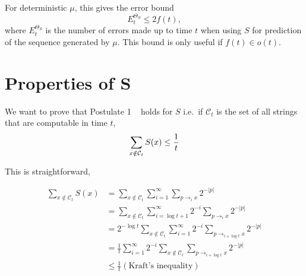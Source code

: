 \documentclass[a4paper]{article}
\def\X{\mathcal{X}}
\def\C{\mathcal{C}}
\begin{document}
For deterministic $\mu$,
this gives the error bound~\cite[Thm.\ 3.36]{Hutter:2005}
\[
E_t^{\Theta_S} \leq 2f(t),
\]
where $E_t^{\Theta_S}$ is the number of errors made up to time $t$
when using $S$ for prediction of the sequence generated by $\mu$.
This bound is only useful if $f(t) \in o(t)$.




\section{Properties of S}

We want to prove that Postulate 1 ~\cite{Schmidhuber:2002} holds for $S$ i.e.\ if $\C_t$ is the set of all strings that are computable in time $t$, 
\begin{equation}
\sum_{x\notin \C_t} S(x) \leq \frac{1}{t} \\ 
\end{equation}

This is straightforward,

\begin{align*}
 \sum_{x\notin \C_t} S(x) &= \sum_{x\notin \C_t} \sum_{i=1}^{\infty}\sum_{p\rightarrow_i x} 2^{-|p|}\\
			&= \sum_{x\notin \C_t} \sum_{i=\log{t+1}}^{\infty} 2^{-i} \sum_{p\rightarrow_i x} 2^{-|p|}\\
			&= 2^{-\log t}\sum_{x\notin \C_t} \sum_{i=1}^{\infty} 2^{-i} \sum_{p\rightarrow_{i+\log t} x} 2^{-|p|}\\
			&= \frac{1}{t} \sum_{i=1}^{\infty} 2^{-i} \sum_{x\notin \C_t} \sum_{p\rightarrow_{i+\log t} x} 2^{-|p|}\\
			&\leq \frac{1}{t} (\text{Kraft's inequality})
\end{align*}








\end{document}
